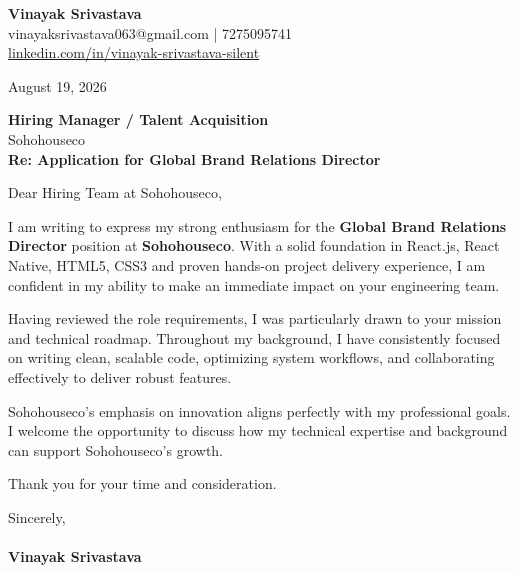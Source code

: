 \documentclass[11pt,a4paper]{article}
\begin{document}
\thispagestyle{empty}

{\Large \textbf{Vinayak Srivastava}}\\
vinayaksrivastava063@gmail.com | 7275095741 \\
\url{linkedin.com/in/vinayak-srivastava-silent}

\vspace{1em}
\hfill August 19, 2026

\textbf{Hiring Manager / Talent Acquisition}\\
Sohohouseco\\

\vspace{1.5em}
\textbf{Re: Application for Global Brand Relations Director}

\vspace{1em}
Dear Hiring Team at Sohohouseco,

I am writing to express my strong enthusiasm for the \textbf{Global Brand Relations Director} position at \textbf{Sohohouseco}. With a solid foundation in React.js, React Native, HTML5, CSS3 and proven hands-on project delivery experience, I am confident in my ability to make an immediate impact on your engineering team.

Having reviewed the role requirements, I was particularly drawn to your mission and technical roadmap. Throughout my background, I have consistently focused on writing clean, scalable code, optimizing system workflows, and collaborating effectively to deliver robust features.

Sohohouseco's emphasis on innovation aligns perfectly with my professional goals. I welcome the opportunity to discuss how my technical expertise and background can support Sohohouseco's growth.

Thank you for your time and consideration.

\vspace{1.5em}
Sincerely,\\
\vspace{1em}\\
\textbf{Vinayak Srivastava}
\end{document}
